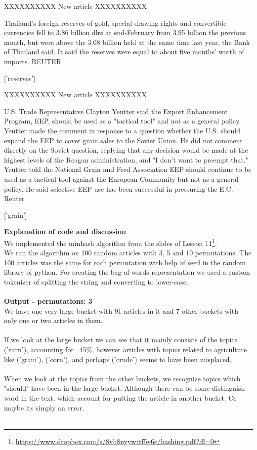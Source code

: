 \documentclass{article}
\begin{document}
\begin{pythonOutput}
['acq']

XXXXXXXXXX
New article
XXXXXXXXXX

Thailand's foreign reserves of gold,
special drawing rights and convertible currencies fell to 3.86
billion dlrs at end-February from 3.95 billion the previous
month, but were above the 3.08 billion held at the same time
last year, the Bank of Thailand said.
    It said the reserves were equal to about five months' worth
of imports.
 REUTER

['reserves']

XXXXXXXXXX
New article
XXXXXXXXXX

U.S. Trade Representative Clayton
Yeutter said the Export Enhancement Program, EEP, should be
used as a "tactical tool" and not as a general policy.
    Yeutter made the comment in response to a question whether
the U.S. should expand the EEP to cover grain sales to the
Soviet Union.
    He did not comment directly on the Soviet question,
replying that any decision would be made at the highest levels
of the Reagan administration, and "I don't want to preempt that."
    Yeutter told the National Grain and Feed Association EEP
should continue to be used as a tactical tool against the
European Community but not as a general policy. He said
selective EEP use has been successful in pressuring the E.C.
 Reuter

['grain']


\end{pythonOutput}
\textbf{Explanation of code and discussion}\\
We implemented the minhash algorithm from the slides of Lesson 11\footnote{\url{https://www.dropbox.com/s/8vh8nyywttf5y6e/hashing.pdf?dl=0}}.\\
We ran the algorithm on 100 random articles with 3, 5 and 10 permutations. The 100 articles was the same for each permutation with help of seed in the random library of python. For creating the bag-of-words representation we used a custom tokenizer of splitting the string and converting to lower-case.\\
~\\
\textbf{Output - permutations: 3}\\
We have one very large bucket with 91 articles in it and 7 other buckets with only one or two articles in them.\\
~\\
If we look at the large bucket we can see that it mainly consists of the topics ('earn'), accounting for ~45\%, however articles with topics related to agriculture like ('grain'), ('corn'), and perhaps ('crude') seems to have been misplaced.\\
~\\
When we look at the topics from the other buckets, we recognize topics which "should" have been in the large bucket. Although there can be some distinguish word in the text, which account for putting the article in another bucket. Or maybe its simply an error. \\
~\\
\end{document}
